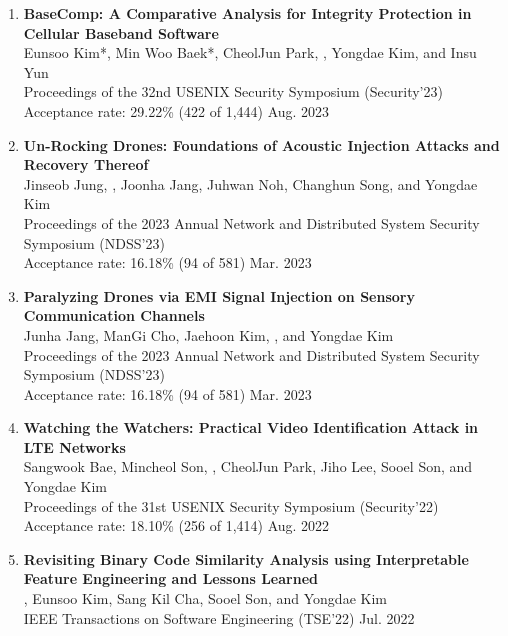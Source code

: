 \begin{enumerate}[leftmargin=1.5em]
    \item \textbf{BaseComp: A Comparative Analysis for Integrity Protection
    in Cellular Baseband Software} \\
        {\small
            Eunsoo Kim*, Min Woo Baek*, CheolJun Park, , Yongdae Kim, and Insu Yun \\
            Proceedings of the 32nd USENIX Security Symposium (Security'23) \\
            Acceptance rate: 29.22\% (422 of 1,444)
        }
    \hfill {\small Aug. 2023}
    
    \item \textbf{Un-Rocking Drones: Foundations of Acoustic
Injection Attacks and Recovery Thereof} \\
        {\small
            Jinseob Jung, , Joonha Jang, Juhwan Noh, Changhun Song, and Yongdae Kim \\
            Proceedings of the 2023 Annual Network and Distributed System Security Symposium (NDSS'23) \\  
            Acceptance rate: 16.18\% (94 of 581)
        }
    \hfill {\small Mar. 2023}

    \item \textbf{Paralyzing Drones via EMI Signal Injection on
Sensory Communication Channels} \\
        {\small
            Junha Jang, ManGi Cho, Jaehoon Kim, , and Yongdae Kim \\
            Proceedings of the 2023 Annual Network and Distributed System Security Symposium (NDSS'23) \\ 
            Acceptance rate: 16.18\% (94 of 581)
        }
    \hfill {\small Mar. 2023}

    \item \textbf{Watching the Watchers: Practical Video Identification Attack
    in LTE Networks} \\
        {\small
            Sangwook Bae, Mincheol Son, , CheolJun Park, Jiho Lee, Sooel Son, and Yongdae Kim \\
            Proceedings of the 31st USENIX Security Symposium (Security'22) \\
            Acceptance rate: 18.10\% (256 of 1,414)
        }
    \hfill {\small Aug. 2022}

    \item \textbf{Revisiting Binary Code Similarity Analysis using Interpretable Feature Engineering and Lessons Learned} \\
        {\small
            , Eunsoo Kim, Sang Kil Cha, Sooel Son, and Yongdae Kim \\
            IEEE Transactions on Software Engineering
            (TSE'22)
        }
    \hfill {\small Jul. 2022}


\end{enumerate}
